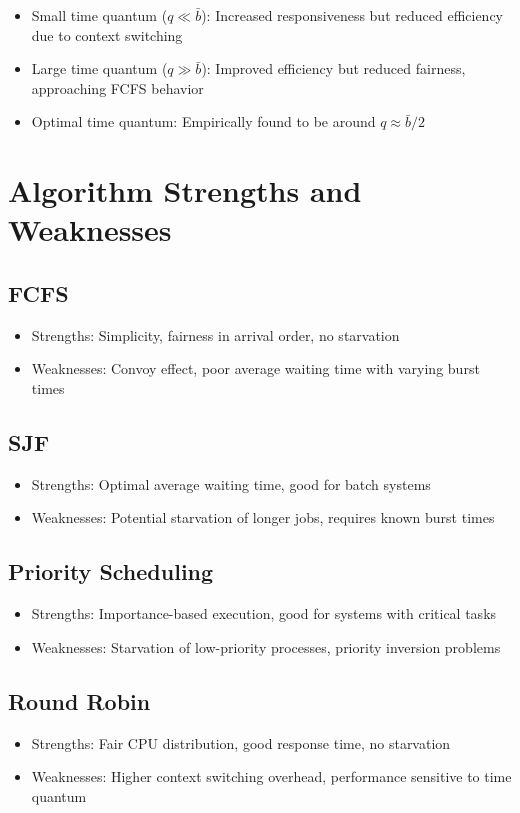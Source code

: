 \documentclass[12pt,a4paper]{report}
\begin{document}
\begin{itemize}
    \item Small time quantum ($q \ll \bar{b}$): Increased responsiveness but reduced efficiency due to context switching
    \item Large time quantum ($q \gg \bar{b}$): Improved efficiency but reduced fairness, approaching FCFS behavior
    \item Optimal time quantum: Empirically found to be around $q \approx \bar{b}/2$
\end{itemize}

\section{Algorithm Strengths and Weaknesses}
\subsection{FCFS}
\begin{itemize}
    \item Strengths: Simplicity, fairness in arrival order, no starvation
    \item Weaknesses: Convoy effect, poor average waiting time with varying burst times
\end{itemize}

\subsection{SJF}
\begin{itemize}
    \item Strengths: Optimal average waiting time, good for batch systems
    \item Weaknesses: Potential starvation of longer jobs, requires known burst times
\end{itemize}

\subsection{Priority Scheduling}
\begin{itemize}
    \item Strengths: Importance-based execution, good for systems with critical tasks
    \item Weaknesses: Starvation of low-priority processes, priority inversion problems
\end{itemize}

\subsection{Round Robin}
\begin{itemize}
    \item Strengths: Fair CPU distribution, good response time, no starvation
    \item Weaknesses: Higher context switching overhead, performance sensitive to time quantum
\end{itemize}
\end{document}
